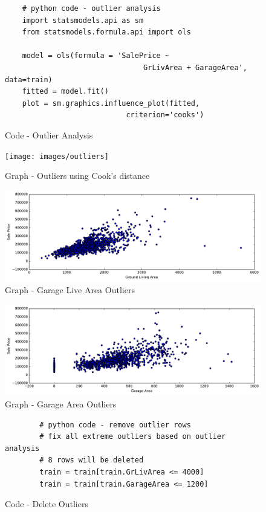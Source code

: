 \documentclass[sigconf]{acmart}
\begin{document}
	\begin{figure}[htb]		
	\begin{verbatim}	
	# python code - outlier analysis
	import statsmodels.api as sm
	from statsmodels.formula.api import ols
	
	model = ols(formula = 'SalePrice ~ 
								GrLivArea + GarageArea', data=train)
	fitted = model.fit()    	
	plot = sm.graphics.influence_plot(fitted, 
							criterion='cooks')		
	\end{verbatim}
	\caption{Code - Outlier Analysis} \label{c:code-outliers} 
	\end{figure}

	\begin{figure}[htb]
		\centering
		\texttt{[image: images/outliers]}	
		\caption{Graph - Outliers using Cook's distance} \label{fig:outliers} 
	\end{figure}
		
	\begin{figure}[htb]
	\centering
	\includegraphics[width=1.0\columnwidth]{images/gr_liv_area_outlier}	
	\caption{Graph - Garage Live Area Outliers} \label{fig:gr-liv-area-outlier} 
	\end{figure}

	\begin{figure}[htb]
	\centering
	\includegraphics[width=1.0\columnwidth]{images/garage_area_outlier}	
	\caption{Graph - Garage Area Outliers} \label{fig:garage-area-outlier} 
	\end{figure}

	\begin{figure}[htb]				
		\begin{verbatim}	
		# python code - remove outlier rows
		# fix all extreme outliers based on outlier analysis
		# 8 rows will be deleted
		train = train[train.GrLivArea <= 4000]
		train = train[train.GarageArea <= 1200]
		\end{verbatim}
		\caption{Code - Delete Outliers} \label{c:code-del-outliers} 
	\end{figure}
\end{document}
